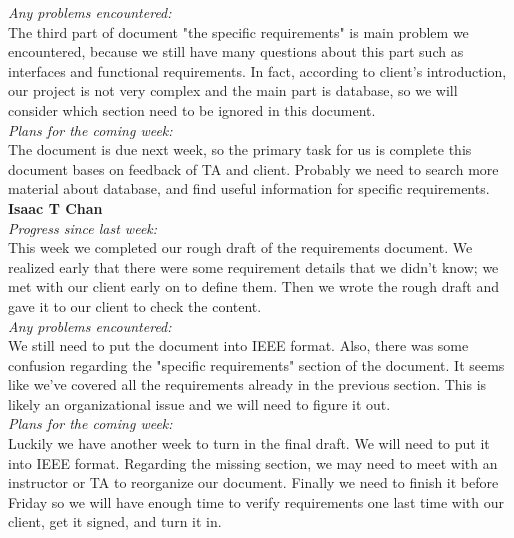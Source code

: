 \noindent\textit{Any problems encountered:}\\
The third part of document "the specific requirements" is main problem we encountered, because we still have many questions about this part such as interfaces and functional requirements. In fact, according to client's introduction, our project is not very complex and the main part is database, so we will consider which section need to be ignored in this document.\\

\noindent\textit{Plans for the coming week:}\\
The document is due next week, so the primary task for us is complete this document bases on feedback of TA and client. Probably we need to search more material about database, and find useful information for specific requirements.\\

\noindent\textbf{Isaac T Chan}\\
\noindent\textit{Progress since last week:}\\
This week we completed our rough draft of the requirements document. We realized early that there were some requirement details that we didn't know; we met with our client early on to define them. Then we wrote the rough draft and gave it to our client to check the content.\\

\noindent\textit{Any problems encountered:}\\
We still need to put the document into IEEE format. Also, there was some confusion regarding the "specific requirements" section of the document. It seems like we've covered all the requirements already in the previous section. This is likely an organizational issue and we will need to figure it out.\\

\noindent\textit{Plans for the coming week:}\\
Luckily we have another week to turn in the final draft. We will need to put it into IEEE format. Regarding the missing section, we may need to meet with an instructor or TA to reorganize our document. Finally we need to finish it before Friday so we will have enough time to verify requirements one last time with our client, get it signed, and turn it in.\\

